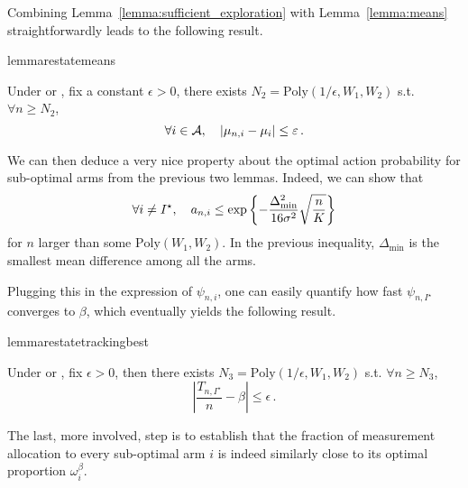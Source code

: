 
Combining Lemma~\ref{lemma:sufficient_exploration} with Lemma~\ref{lemma:means} straightforwardly leads to the following result.

\begin{restatable}{lemma}{restatemeans}\label{lemma:tracking_means}
\begin{leftbar}[lemmabar]
    Under \TTTS or \TCC, fix a constant $\epsilon > 0$, there exists $N_2 = \text{Poly}(1/\epsilon,W_1,W_2)$ s.t. $\forall n \geq N_2$,
    \[
        \forall i \in \mathcal{A}, \quad |\mu_{n,i}-\mu_i| \leq \varepsilon\,.
    \]
\end{leftbar}
\end{restatable}

We can then deduce a very nice property about the optimal action probability for sub-optimal arms from the previous two lemmas. Indeed, we can show that
\[
    \forall i\neq I^\star, \quad a_{n,i} \leq \exp\left\{-\frac{\Delta_{\text{min}}^2}{16\sigma^2}\sqrt{\frac{n}{K}}\right\}
\]
for $n$ larger than some $\text{Poly}(W_1,W_2)$. In the previous inequality, $\Delta_{\text{min}}$ is the smallest mean difference among all the arms.

Plugging this in the expression of $\psi_{n,i}$, one can easily quantify how fast $\psi_{n,I^\star}$ converges to $\beta$, which eventually yields the following result. 

\begin{restatable}{lemma}{restatetrackingbest}\label{lemma:tracking_best}
\begin{leftbar}[lemmabar]
    Under \TTTS or \TCC, fix $\epsilon > 0$, then there exists $N_3 = \text{Poly}(1/\epsilon,W_1,W_2)$ s.t. $\forall n \geq N_3$,
    \[
        \left|\frac{T_{n,I^\star}}{n} - \beta\right| \leq \epsilon\,. 
    \]
\end{leftbar}
\end{restatable}

The last, more involved, step is to establish that the fraction of measurement allocation to every sub-optimal arm $i$ is indeed similarly close to its optimal proportion $\omega_i^\beta$.

